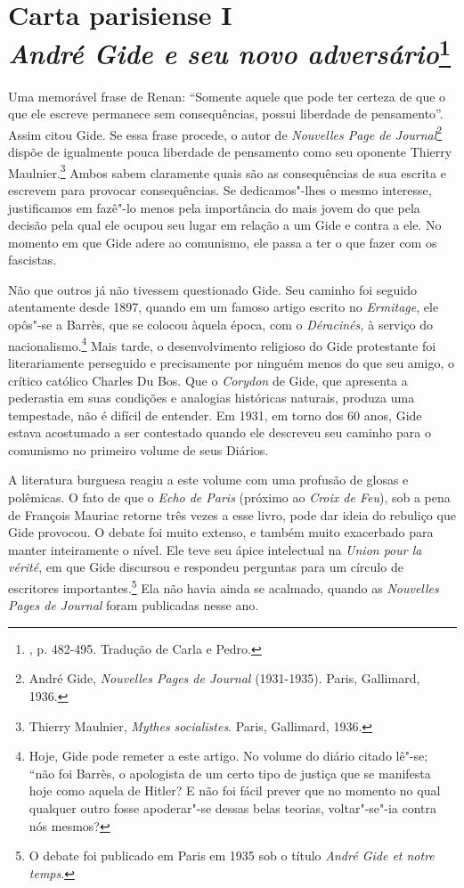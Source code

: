 \chapter{Carta parisiense I\\ \emph{André Gide e seu novo adversário}\footnote[*]{
  , p. 482-495. Tradução de Carla e Pedro.}}

Uma memorável frase de Renan: ``Somente aquele que pode ter certeza de
que o que ele escreve permanece sem consequências, possui liberdade de
pensamento''. Assim citou Gide. Se essa frase procede, o autor de
\emph{Nouvelles Page de Journal}\footnote{André Gide,
  \emph{Nouvelles Pages de Journal} (1931-1935). Paris, Gallimard, 1936. \versal{[N. A.]}}
dispõe de igualmente pouca liberdade de pensamento como seu oponente
Thierry Maulnier.\footnote{Thierry Maulnier, \emph{Mythes
  socialistes}. Paris, Gallimard, 1936. \versal{[N. A.]}} Ambos sabem claramente quais
são as consequências de sua escrita e escrevem para provocar
consequências. Se dedicamos"-lhes o mesmo interesse, justificamos em
fazê"-lo menos pela importância do mais jovem do que pela decisão pela
qual ele ocupou seu lugar em relação a um Gide e contra a ele. No
momento em que Gide adere ao comunismo, ele passa a ter o que fazer com
os fascistas.

Não que outros já não tivessem questionado Gide. Seu caminho foi seguido
atentamente desde 1897, quando em um famoso artigo escrito no
\emph{Ermitage}, ele opôs"-se a Barrès, que se colocou àquela época, com
o \emph{Déracinés,} à serviço do nacionalismo.\footnote{Hoje, Gide
  pode remeter a este artigo. No volume do diário citado lê"-se; ``não
  foi Barrès, o apologista de um certo tipo de justiça que se manifesta
  hoje como aquela de Hitler? E não foi fácil prever que no momento no
  qual qualquer outro fosse apoderar"-se dessas belas teorias,
  voltar"-se"-ia contra nós mesmos? \versal{[N. A.]}} Mais tarde, o desenvolvimento
religioso do Gide protestante foi literariamente perseguido e
precisamente por ninguém menos do que seu amigo, o crítico católico
Charles Du Bos. Que o \emph{Corydon} de Gide, que apresenta a pederastia
em suas condições e analogias históricas naturais, produza uma
tempestade, não é difícil de entender. Em 1931, em torno dos 60 anos,
Gide estava acostumado a ser contestado quando ele descreveu seu caminho
para o comunismo no primeiro volume de seus Diários.

A literatura burguesa reagiu a este volume com uma profusão de glosas e
polêmicas. O fato de que o \emph{Echo de Paris} (próximo ao \emph{Croix
de Feu}), sob a pena de François Mauriac retorne três vezes a esse
livro, pode dar ideia do rebuliço que Gide provocou. O debate foi muito
extenso, e também muito exacerbado para manter inteiramente o nível. Ele
teve seu ápice intelectual na \emph{Union pour la vérité}, em que Gide
discursou e respondeu perguntas para um círculo de escritores
importantes.\footnote{O debate foi publicado em Paris em 1935 sob o
  título \emph{André Gide et notre temps}. \versal{[N. A.]}} Ela não havia ainda se
acalmado, quando as \emph{Nouvelles Pages de Journal} foram publicadas
nesse ano.

